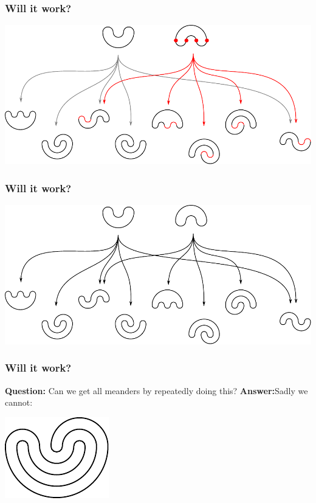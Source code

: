 \documentclass{beamer}
\begin{document}
\begin{frame}
\frametitle{Will it work?}
\begin{center}
\includegraphics[width=\textwidth]{meanders/2-into-3_3.pdf}
\end{center}
\end{frame}

\begin{frame}
\frametitle{Will it work?}
\begin{center}
\includegraphics[width=\textwidth]{meanders/2-into-3_4.pdf}
\end{center}
\end{frame}

\begin{frame}
\frametitle{Will it work?}
\textbf{Question:} Can we get all meanders by repeatedly doing this?
\pause
\pause\textbf{Answer:}\pause Sadly we cannot:

\begin{center}
\includegraphics[width=.4\textwidth]{meanders/5-example.pdf}
\end{center}

\end{frame}
\end{document}
